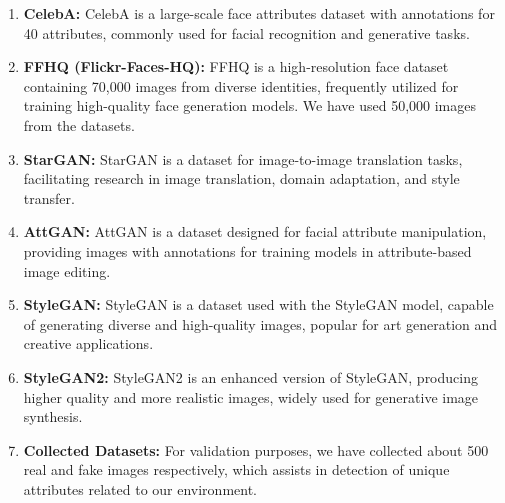 \begin{enumerate}
    \item \textbf{CelebA:} CelebA is a large-scale face attributes dataset with annotations for 40 attributes, commonly used for facial recognition and generative tasks.

    \item \textbf{FFHQ (Flickr-Faces-HQ):} FFHQ is a high-resolution face dataset containing 70,000 images from diverse identities, frequently utilized for training high-quality face generation models. We have used 50,000 images from the datasets.

    \item \textbf{StarGAN:} StarGAN is a dataset for image-to-image translation tasks, facilitating research in image translation, domain adaptation, and style transfer.

    \item \textbf{AttGAN:} AttGAN is a dataset designed for facial attribute manipulation, providing images with annotations for training models in attribute-based image editing.

    \item \textbf{StyleGAN:} StyleGAN is a dataset used with the StyleGAN model, capable of generating diverse and high-quality images, popular for art generation and creative applications.

    \item \textbf{StyleGAN2:} StyleGAN2 is an enhanced version of StyleGAN, producing higher quality and more realistic images, widely used for generative image synthesis.
    
    \item \textbf{Collected Datasets:} For validation purposes, we have collected about 500 real and fake images respectively, which assists in detection of unique attributes related to our environment.

\end{enumerate}


